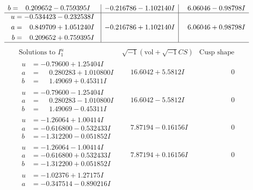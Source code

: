 \documentclass[1p]{elsarticle_modified}
\theoremstyle{definition}
\newcommand{\I}{\sqrt{-1}}
\begin{document}
$$\begin{array}{c|c|c}
\begin{aligned}
b &= \phantom{-}0.209652 - 0.759395 I\end{aligned}
 & -0.216786 - 1.102140 I & \phantom{-}6.06046 - 0.98798 I \\ \hline\begin{aligned}
u &= -0.534423 - 0.232538 I \\
a &= \phantom{-}0.849709 + 1.051240 I \\
b &= \phantom{-}0.209652 + 0.759395 I\end{aligned}
 & -0.216786 + 1.102140 I & \phantom{-}6.06046 + 0.98798 I\\
 \hline 
 \end{array}$$\newpage$$\begin{array}{c|c|c}  
\text{Solutions to }I^u_{1}& \I (\text{vol} + \sqrt{-1}CS) & \text{Cusp shape}\\
 \hline 
\begin{aligned}
u &= -0.79600 + 1.25404 I \\
a &= \phantom{-}0.280283 + 1.010800 I \\
b &= \phantom{-}1.49069 + 0.45311 I\end{aligned}
 & \phantom{-}16.6042 + 5.5812 I & \phantom{-0.000000 } 0 \\ \hline\begin{aligned}
u &= -0.79600 - 1.25404 I \\
a &= \phantom{-}0.280283 - 1.010800 I \\
b &= \phantom{-}1.49069 - 0.45311 I\end{aligned}
 & \phantom{-}16.6042 - 5.5812 I & \phantom{-0.000000 } 0 \\ \hline\begin{aligned}
u &= -1.26064 + 1.00414 I \\
a &= -0.616800 - 0.532433 I \\
b &= -1.312200 - 0.051852 I\end{aligned}
 & \phantom{-}7.87194 - 0.16156 I & \phantom{-0.000000 } 0 \\ \hline\begin{aligned}
u &= -1.26064 - 1.00414 I \\
a &= -0.616800 + 0.532433 I \\
b &= -1.312200 + 0.051852 I\end{aligned}
 & \phantom{-}7.87194 + 0.16156 I & \phantom{-0.000000 } 0 \\ \hline\begin{aligned}
u &= -1.02376 + 1.27175 I \\
a &= -0.347514 - 0.890216 I \\

\end{aligned}
\end{array}$$
\end{document}
